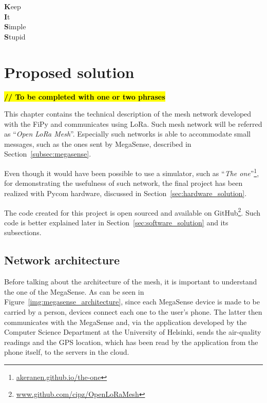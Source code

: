 
\begin{savequote}[40mm]
	\textbf{K}eep\\
	\textbf{I}t\\
	\textbf{S}imple\\
	\textbf{S}tupid
\end{savequote}

\chapter{Proposed solution}\label{chapter:proposed_solution}
	
	\textbf{\textcolor{red}{\hl{// To be completed with one or two phrases}}}

	This chapter contains the technical description of the mesh network developed with the FiPy and communicates using LoRa.
	Such mesh network will be referred as ``\textit{Open LoRa Mesh}''.
	Especially such networks is able to accommodate small messages, such as the ones sent by MegaSense, described in Section~\ref{subsec:megasense}.

	Even though it would have been possible to use a simulator, such as ``\textit{The one}''\footnote{ \url{akeranen.github.io/the-one}}, for demonstrating the usefulness of such network, the final project has been realized with Pycom hardware, discussed in Section~\ref{sec:hardware_solution}.
	
	The code created for this project is open sourced and available on GitHub\footnote{ \url{www.github.com/cipz/OpenLoRaMesh}}.
	Such code is better explained later in Section~\ref{sec:software_solution} and its subsections.
	
	\section{Network architecture}\label{sec:architecture}
		
		Before talking about the architecture of the mesh, it is important to understand the one of the MegaSense.
		As can be seen in Figure~\ref{img:megasense_architecture}, since each MegaSense device is made to be carried by a person, devices connect each one to the user's phone.
		The latter then communicates with the MegaSense and, via the application developed by the Computer Science Department at the University of Helsinki, sends the air-quality readings and the GPS location, which has been read by the application from the phone itself, to the servers in the cloud.
		
